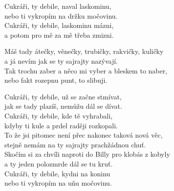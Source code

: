 
\ve{}
Cukráři, ty debile, naval laskominu,\\
nebo ti vykropím na držku močovinu.\\
Cukráři, ty debile, laskominu mázni,\\
a potom pro mě za mě třeba zmizni.

\ve{}
Máš tady átečky, věnečky, trubičky, rakvičky, kuličky\\
a já nevím jak se ty sajrajty nazývají.\\
Tak trochu zaber a něco mi vyber a bleskem to naber,\\
nebo fakt rozepnu punt, to slibuji.

\ve{}
Cukráři, ty debile, už se začne stmívat,\\
jak se tady plazíš, nemůžu dál se dívat.\\
Cukráři, ty debile, kde tě vyhrabali,\\
kdyby ti kule a prdel raději rozkopali.\\
To že jsi pitomec není přec nakonec taková nová věc,\\
stejně nemám na ty sajrajty prachžádnou chuť.\\
Skočím si za chvíli naproti do Billy pro klobás z kobyly\\
a ty jeden polozmrde dál se tu kruť.\\
Cukráři, ty debile, kydni na koninu\\
nebo ti vykropím na uňu močovinu.

\esong{}
